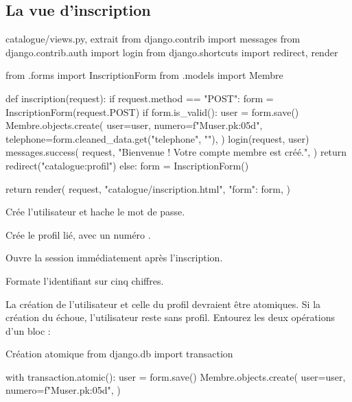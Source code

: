 \subsection{La vue d'inscription}

\begin{codebox}[python]{catalogue/views.py, extrait}
from django.contrib import messages
from django.contrib.auth import login
from django.shortcuts import redirect, render

from .forms import InscriptionForm
from .models import Membre


def inscription(request):
    if request.method == "POST":
        form = InscriptionForm(request.POST)
        if form.is_valid():
            user = form.save()
            Membre.objects.create(
                user=user,
                numero=f"M{user.pk:05d}",
                telephone=form.cleaned_data.get("telephone", ""),
            )
            login(request, user)
            messages.success(
                request,
                "Bienvenue ! Votre compte membre est créé.",
            )
            return redirect("catalogue:profil")
    else:
        form = InscriptionForm()

    return render(
        request,
        "catalogue/inscription.html",
        {"form": form},
    )
\end{codebox}

\begin{description}[leftmargin=4.9cm,style=nextline]
  \item[\code{form.save()}] Crée l'utilisateur et hache le mot de passe.
  \item[\code{Membre.objects.create}] Crée le profil lié, avec un numéro
  .
  \item[\code{login(request, user)}] Ouvre la session immédiatement après
  l'inscription.
  \item[\code{f"M{user.pk:05d}"}] Formate l'identifiant sur cinq chiffres.
\end{description}

\begin{attention}
La création de l'utilisateur et celle du profil devraient être atomiques. Si la
création du  échoue, l'utilisateur reste sans profil. Entourez les deux
opérations d'un bloc  :
\end{attention}

\begin{codebox}[python]{Création atomique}
from django.db import transaction

with transaction.atomic():
    user = form.save()
    Membre.objects.create(
        user=user,
        numero=f"M{user.pk:05d}",
    )
\end{codebox}

